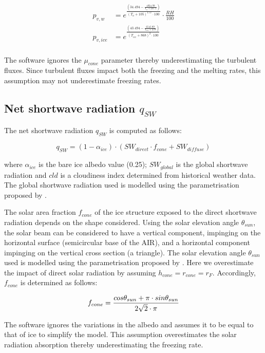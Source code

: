 \documentclass[utf8]{frontiersSCNS}
\begin{document}
\begin{equation}
	\begin{split}
		p_{v,w}&=e^{\frac{(34.494 - \frac{4924.99}{T_{a} + 237.1})}{(T_a + 105)^{1.57} \cdot 100}} \cdot \frac{RH}{100} \\
		p_{v,ice}&=e^{\frac{(43.494 - \frac{6545.89}{T_{ice} + 278})}{(T_{ice} + 868)^{2} \cdot 100}} \\
	\end{split} \label{eqn:vp}
\end{equation}

The software ignores the $\mu_{cone}$ parameter thereby underestimating the turbulent fluxes. Since turbulent
fluxes impact both the freezing and the melting rates, this assumption may not underestimate freezing rates.

\subsection{Net shortwave radiation \texorpdfstring{$q_{SW}$}{Lg}}
\label{sec:SW}

The net shortwave radiation $q_{SW}$ is computed as follows:

\begin{equation} q_{SW} = (1- \alpha_{ice}) \cdot ( SW_{direct} \cdot f_{cone} + SW_{diffuse})
\label{eqn:SW} \end{equation}

where $\alpha_{ice}$ is the bare ice albedo value (0.25); $SW_{global}$ is the global shortwave radiation and
$cld$ is a cloudiness index determined from historical weather data. The global shortwave radiation used is
modelled using the parametrisation proposed by \cite{Woolf_1968}.

The solar area fraction $f_{cone}$ of the ice structure exposed to the direct shortwave radiation depends on the
shape considered. Using the solar elevation angle $\theta_{sun}$, the solar beam can be considered to have a
vertical component, impinging on the horizontal surface (semicircular base of the AIR), and a horizontal
component impinging on the vertical cross section (a triangle). The solar elevation angle $\theta_{sun}$ used is
modelled using the parametrisation proposed by \cite{Woolf_1968}. Here we overestimate the impact of direct
solar radiation by assuming $h_{cone} = r_{cone} = r_{F}$. Accordingly, $f_{cone}$ is determined as follows:

\begin{equation}
	\begin{split}
		f_{cone}& =\frac{ cos \theta_{sun} + \pi \cdot sin \theta_{sun} }{2\sqrt{2} \cdot \pi }\\
	\end{split}
	\label{ eqn:f_{cone}}
\end{equation}

The software ignores the variations in the albedo and assumes it to be equal to that of ice to simplify the
model. This assumption overestimates the solar radiation absorption thereby underestimating the freezing rate.

 
\end{document}
